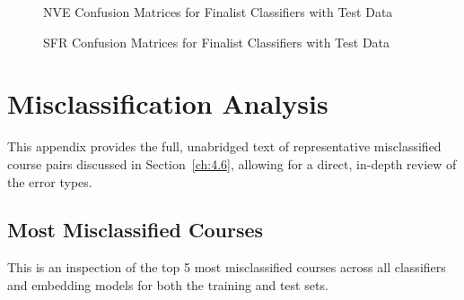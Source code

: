 \begin{figure}[!h]
    \captionsetup{skip=5pt}
    \centering
    \caption{NVE Confusion Matrices for Finalist Classifiers with Test Data}
\end{figure}

\begin{figure}[!h]
    \captionsetup{skip=5pt}
    \centering
    \caption{SFR Confusion Matrices for Finalist Classifiers with Test Data}
\end{figure}


\chapter{Misclassification Analysis}
This appendix provides the full, unabridged text of representative misclassified course pairs discussed in Section~\ref{ch:4.6}, allowing for a direct, in-depth review of the error types.

\section{Most Misclassified Courses}\label{app:mostmiscls}
This is an inspection of the top 5 most misclassified courses across all classifiers and embedding models for both the training and test sets.

